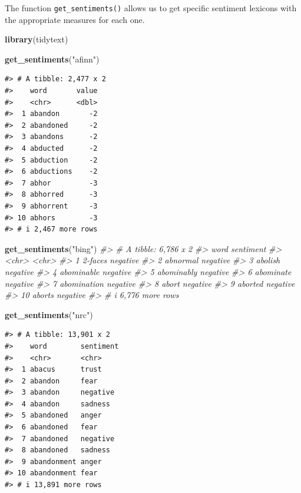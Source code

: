 \documentclass[
]{book}
\newenvironment{Shaded}{\begin{snugshade}}{\end{snugshade}}
\newcommand{\CommentTok}[1]{\textcolor[rgb]{0.56,0.35,0.01}{\textit{#1}}}
\newcommand{\FunctionTok}[1]{\textcolor[rgb]{0.13,0.29,0.53}{\textbf{#1}}}
\newcommand{\NormalTok}[1]{#1}
\newcommand{\StringTok}[1]{\textcolor[rgb]{0.31,0.60,0.02}{#1}}
\begin{document}
The function \texttt{get\_sentiments()} allows us to get specific sentiment lexicons with the appropriate measures for each one.

\begin{Shaded}
\begin{Highlighting}[]
\FunctionTok{library}\NormalTok{(tidytext)}

\FunctionTok{get\_sentiments}\NormalTok{(}\StringTok{"afinn"}\NormalTok{)}
\end{Highlighting}
\end{Shaded}

\begin{verbatim}
#> # A tibble: 2,477 x 2
#>    word       value
#>    <chr>      <dbl>
#>  1 abandon       -2
#>  2 abandoned     -2
#>  3 abandons      -2
#>  4 abducted      -2
#>  5 abduction     -2
#>  6 abductions    -2
#>  7 abhor         -3
#>  8 abhorred      -3
#>  9 abhorrent     -3
#> 10 abhors        -3
#> # i 2,467 more rows
\end{verbatim}

\begin{Shaded}
\begin{Highlighting}[]
\FunctionTok{get\_sentiments}\NormalTok{(}\StringTok{"bing"}\NormalTok{)}
\CommentTok{\#\textgreater{} \# A tibble: 6,786 x 2}
\CommentTok{\#\textgreater{}    word        sentiment}
\CommentTok{\#\textgreater{}    \textless{}chr\textgreater{}       \textless{}chr\textgreater{}    }
\CommentTok{\#\textgreater{}  1 2{-}faces     negative }
\CommentTok{\#\textgreater{}  2 abnormal    negative }
\CommentTok{\#\textgreater{}  3 abolish     negative }
\CommentTok{\#\textgreater{}  4 abominable  negative }
\CommentTok{\#\textgreater{}  5 abominably  negative }
\CommentTok{\#\textgreater{}  6 abominate   negative }
\CommentTok{\#\textgreater{}  7 abomination negative }
\CommentTok{\#\textgreater{}  8 abort       negative }
\CommentTok{\#\textgreater{}  9 aborted     negative }
\CommentTok{\#\textgreater{} 10 aborts      negative }
\CommentTok{\#\textgreater{} \# i 6,776 more rows}
\end{Highlighting}
\end{Shaded}

\begin{Shaded}
\begin{Highlighting}[]
\FunctionTok{get\_sentiments}\NormalTok{(}\StringTok{"nrc"}\NormalTok{)}
\end{Highlighting}
\end{Shaded}

\begin{verbatim}
#> # A tibble: 13,901 x 2
#>    word        sentiment
#>    <chr>       <chr>    
#>  1 abacus      trust    
#>  2 abandon     fear     
#>  3 abandon     negative 
#>  4 abandon     sadness  
#>  5 abandoned   anger    
#>  6 abandoned   fear     
#>  7 abandoned   negative 
#>  8 abandoned   sadness  
#>  9 abandonment anger    
#> 10 abandonment fear     
#> # i 13,891 more rows
\end{verbatim}
\end{document}
